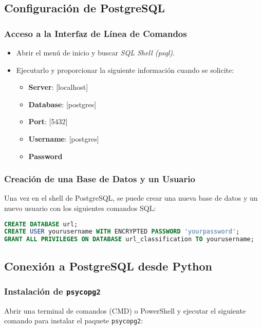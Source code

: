 \subsection*{Configuración de PostgreSQL}

\subsubsection*{Acceso a la Interfaz de Línea de Comandos}
\begin{itemize}
    \item Abrir el menú de inicio y buscar \textit{SQL Shell (psql)}.
    \item Ejecutarlo y proporcionar la siguiente información cuando se solicite:
    \begin{itemize}
        \item \textbf{Server}:  [localhost]
        \item \textbf{Database}:  [postgres]
        \item \textbf{Port}:  [5432]
        \item \textbf{Username}: [postgres]
        \item \textbf{Password}
    \end{itemize}
\end{itemize}

\subsubsection*{Creación de una Base de Datos y un Usuario}
Una vez en el shell de PostgreSQL, se puede crear una nueva base de datos y un nuevo usuario con los siguientes comandos SQL:

\begin{lstlisting}[language=SQL, caption=Comandos SQL para crear una base de datos y un usuario]
CREATE DATABASE url;
CREATE USER yourusername WITH ENCRYPTED PASSWORD 'yourpassword';
GRANT ALL PRIVILEGES ON DATABASE url_classification TO yourusername;
\end{lstlisting}

\subsection*{Conexión a PostgreSQL desde Python}

\subsubsection*{Instalación de \texttt{psycopg2}}
Abrir una terminal de comandos (CMD) o PowerShell y ejecutar el siguiente comando para instalar el paquete \texttt{psycopg2}:


